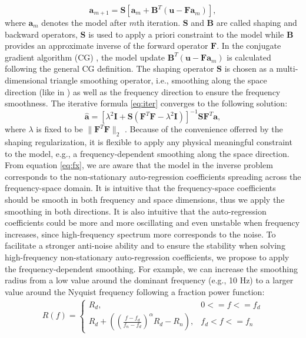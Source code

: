  \begin{equation}
\label{eq:iter}
\mathbf{a}_{m+1} = \mathbf{S}[\mathbf{a}_m + \mathbf{B}^T(\mathbf{u}-\mathbf{Fa}_m)] ,
\end{equation}
where $\mathbf{a}_{m}$ denotes the model after $m$th iteration. $\mathbf{S}$ and $\mathbf{B}$ are called shaping and backward operators, $\mathbf{S}$ is used to apply a priori constraint to the model while  $\mathbf{B}$ provides an approximate inverse of the forward operator $\mathbf{F}$. In the conjugate gradient algorithm (CG) \cite[]{fomel2007shape}, the model update $\mathbf{B}^T(\mathbf{u}-\mathbf{Fa}_m)$ is calculated following the general CG definition. The shaping operator $\mathbf{S}$ is chosen as a multi-dimensional triangle smoothing operator, i.e., smoothing along the space direction (like in \cite{guochang2012}) as well as the frequency direction to ensure the frequency smoothness. The iterative formula \ref{eq:iter} converges to the following solution:
\begin{equation}
\label{eq:fx33}
\hat{\mathbf{a}} = [\lambda^2\mathbf{I} + \mathbf{S}(\mathbf{F}^T\mathbf{F}-\lambda^2\mathbf{I}) ]^{-1}\mathbf{S}\mathbf{F}^T\mathbf{a},
\end{equation}
where $\lambda$ is fixed to be $\parallel\mathbf{F}^T\mathbf{F}\parallel_2$ \cite[]{fomel2007shape}. Because of the convenience offerred by the shaping regularization, it is flexible to apply any physical meaningful constraint to the model, e.g., a frequency-dependent smoothing along the space direction. From equation \ref{eq:fx}, we are aware that the model in the inverse problem corresponds to the non-stationary auto-regression coefficients spreading across the frequency-space domain. It is intuitive that the frequency-space coefficients should be smooth in both frequency and space dimensions, thus we apply the smoothing in both directions. It is also intuitive that the auto-regression coefficients could be more and more oscillating and even unstable when frequency increases, since high-frequency spectrum more corresponds to the noise. To facilitate a stronger anti-noise ability and to ensure the stability when solving high-frequency non-stationary auto-regression coefficients, we propose to apply the frequency-dependent smoothing. For example, we can increase the smoothing radius from a low value around the dominant frequency (e.g., 10 Hz) to a larger value around the Nyquist frequency following a fraction power function:
\begin{align}
\label{eq:fs}
R(f) = \left\{\begin{array}{ll}
R_d, & 0<=f<=f_d \\
R_d+\left(\left(\frac{f-f_d}{f_n-f_d}\right)^{\alpha}R_d-R_n\right),& f_d<f<=f_n
\end{array} \right.
\end{align}
